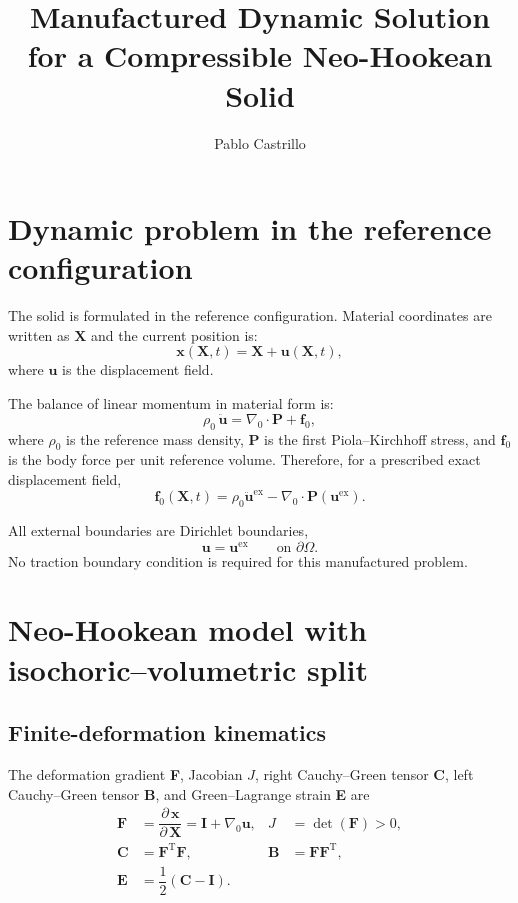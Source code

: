 \documentclass[11pt,a4paper]{article}
\title{Manufactured Dynamic Solution for a Compressible Neo-Hookean Solid}
\author{Pablo Castrillo}
\date{}
\newcommand{\Grad}{\nabla}
\newcommand{\Id}{\textbf{I}}
\begin{document}
\maketitle

\section{Dynamic problem in the reference configuration}

The solid is formulated in the reference configuration. Material coordinates are written as $\textbf{X}$ and the current position is:
%
\begin{equation}
\textbf{x}(\textbf{X},t)=\textbf{X}+\textbf{u}(\textbf{X},t),
\end{equation}
%
where $\textbf{u}$ is the displacement field.

The balance of linear momentum in material form is:
%
\begin{equation}\label{eq_momentum}
\rho_0\,\ddot{\textbf{u}}=\Grad_0\cdot\textbf{P}+\textbf{f}_0,
\end{equation}
%
where $\rho_0$ is the reference mass density, $\textbf{P}$ is the first Piola--Kirchhoff stress, and $\textbf{f}_0$ is the body force per unit reference volume. Therefore, for a prescribed exact displacement field,
%
\begin{equation}\label{eq_manufacturedForce}
\textbf{f}_0(\textbf{X},t)
=\rho_0\ddot{\textbf{u}}^{\text{ex}}
-\Grad_0\cdot\textbf{P}(\textbf{u}^{\text{ex}}).
\end{equation}

All external boundaries are Dirichlet boundaries,
%
\begin{equation}\label{eq_allDirichlet}
\textbf{u}=\textbf{u}^{\text{ex}}
\qquad\text{on }\partial\Omega.
\end{equation}
%
No traction boundary condition is required for this manufactured problem.

\section{Neo-Hookean model with isochoric--volumetric split}

\subsection{Finite-deformation kinematics}

The deformation gradient \textbf{F}, Jacobian $J$, right Cauchy--Green tensor \textbf{C}, left Cauchy--Green tensor \textbf{B}, and Green--Lagrange strain \textbf{E} are
%
\begin{align}
\textbf{F}&=\dfrac{\partial\,\textbf{x}}{\partial\,\textbf{X}}
=\Id+\Grad_0\textbf{u},
&J&=\det(\textbf{F})>0,
\\
\textbf{C}&=\textbf{F}^{\text{T}}\textbf{F},
&\textbf{B}&=\textbf{F}\textbf{F}^{\text{T}},
\\
\textbf{E}&=\dfrac12(\textbf{C}-\Id).
\end{align}
\end{document}
